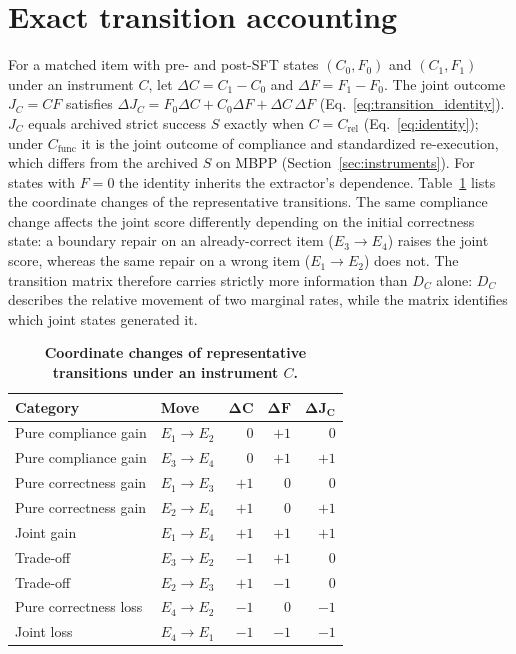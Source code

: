 \documentclass{article}
\newcommand{\Crel}{C_{\mathrm{rel}}}
\newcommand{\Cfunc}{C_{\mathrm{func}}}
\newcommand{\Eone}{E_1}
\newcommand{\Etwo}{E_2}
\newcommand{\Ethree}{E_3}
\newcommand{\Efour}{E_4}
\newcommand{\Jinst}{J_C}
\begin{document}
\section{Exact transition accounting}
\label{app:transition_algebra}
For a matched item with pre- and post-SFT states $(C_0,F_0)$ and $(C_1,F_1)$
under an instrument $C$, let $\Delta C=C_1-C_0$ and $\Delta F=F_1-F_0$. The
joint outcome $\Jinst=CF$ satisfies
$\Delta\Jinst=F_0\Delta C+C_0\Delta F+\Delta C\,\Delta F$
(Eq.~\ref{eq:transition_identity}). $\Jinst$ equals archived strict success
$S$ exactly when $C=\Crel$ (Eq.~\ref{eq:identity}); under $\Cfunc$ it is the
joint outcome of compliance and standardized re-execution, which differs from
the archived $S$ on MBPP (Section~\ref{sec:instruments}). For states with
$F=0$ the identity inherits the extractor's dependence. Table~\ref{tab:transition_algebra} lists the coordinate changes of
the representative transitions. The same compliance change affects the joint
score differently depending on the initial correctness state: a boundary
repair on an already-correct item ($\Ethree\!\to\!\Efour$) raises the joint
score, whereas the same repair on a wrong item ($\Eone\!\to\!\Etwo$) does not.
The transition matrix therefore carries strictly more information than
$D_C$ alone: $D_C$ describes the relative movement of two marginal rates,
while the matrix identifies which joint states generated it.

\begin{table}[ht]
\centering
\small
\setlength{\tabcolsep}{8pt}
\begin{tabular}{llrrr}
\toprule
\textbf{Category} & \textbf{Move} & $\boldsymbol{\Delta C}$ & $\boldsymbol{\Delta F}$ & $\boldsymbol{\Delta\Jinst}$\\
\midrule
Pure compliance gain  & $\Eone\to\Etwo$   & 0    & $+1$ & 0\\
Pure compliance gain  & $\Ethree\to\Efour$ & 0    & $+1$ & $+1$\\
Pure correctness gain & $\Eone\to\Ethree$ & $+1$ & 0    & 0\\
Pure correctness gain & $\Etwo\to\Efour$  & $+1$ & 0    & $+1$\\
Joint gain            & $\Eone\to\Efour$  & $+1$ & $+1$ & $+1$\\
Trade-off             & $\Ethree\to\Etwo$ & $-1$ & $+1$ & 0\\
Trade-off             & $\Etwo\to\Ethree$ & $+1$ & $-1$ & 0\\
Pure correctness loss & $\Efour\to\Etwo$  & $-1$ & 0    & $-1$\\
Joint loss            & $\Efour\to\Eone$  & $-1$ & $-1$ & $-1$\\
\bottomrule
\end{tabular}
\caption{\textbf{Coordinate changes of representative transitions under an
instrument $C$.}}
\label{tab:transition_algebra}
\end{table}
\end{document}

